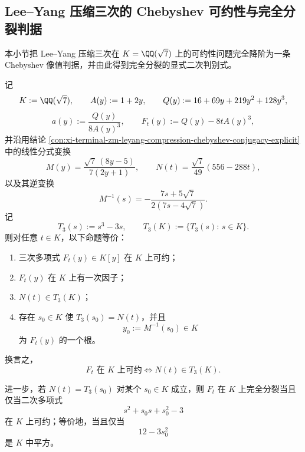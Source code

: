 \subsection{Lee--Yang 压缩三次的 Chebyshev 可约性与完全分裂判据}\label{subsec:conclusion-leyang-compressed-cubic-chebyshev-reducibility}
本小节把 Lee--Yang 压缩三次在 \(K=\QQ(\sqrt7)\) 上的可约性问题完全降阶为一条 Chebyshev 像值判据，并由此得到完全分裂的显式二次判别式。

\begin{theorem}\label{thm:conclusion-leyang-compressed-cubic-chebyshev-reducibility}
记
\[
K:=\QQ(\sqrt7),
\qquad
A(y):=1+2y,
\qquad
Q(y):=16+69y+219y^2+128y^3,
\]
\[
a(y):=\frac{Q(y)}{8A(y)^3},
\qquad
F_t(y):=Q(y)-8tA(y)^3,
\]
并沿用结论 \ref{con:xi-terminal-zm-leyang-compression-chebyshev-conjugacy-explicit} 中的线性分式变换
\[
M(y)=\frac{\sqrt7\,(8y-5)}{7(2y+1)},
\qquad
N(t)=\frac{\sqrt7}{49}(556-288t),
\]
以及其逆变换
\[
M^{-1}(s)=-\frac{7s+5\sqrt7}{2(7s-4\sqrt7)}.
\]
记
\[
T_3(s):=s^3-3s,
\qquad
T_3(K):=\{T_3(s):\,s\in K\}.
\]
则对任意 \(t\in K\)，以下命题等价：
\begin{enumerate}
  \item 三次多项式 \(F_t(y)\in K[y]\) 在 \(K\) 上可约；
  \item \(F_t(y)\) 在 \(K\) 上有一次因子；
  \item \(N(t)\in T_3(K)\)；
  \item 存在 \(s_0\in K\) 使 \(T_3(s_0)=N(t)\)，并且
  \[
  y_0:=M^{-1}(s_0)\in K
  \]
  为 \(F_t(y)\) 的一个根。
\end{enumerate}
换言之，
\[
F_t \text{ 在 }K\text{ 上可约}
\iff
N(t)\in T_3(K).
\]

进一步，若 \(N(t)=T_3(s_0)\) 对某个 \(s_0\in K\) 成立，则 \(F_t\) 在 \(K\) 上完全分裂当且仅当二次多项式
\[
s^2+s_0s+s_0^2-3
\]
在 \(K\) 上可约；等价地，当且仅当
\[
12-3s_0^2
\]
是 \(K\) 中平方。
\end{theorem}
